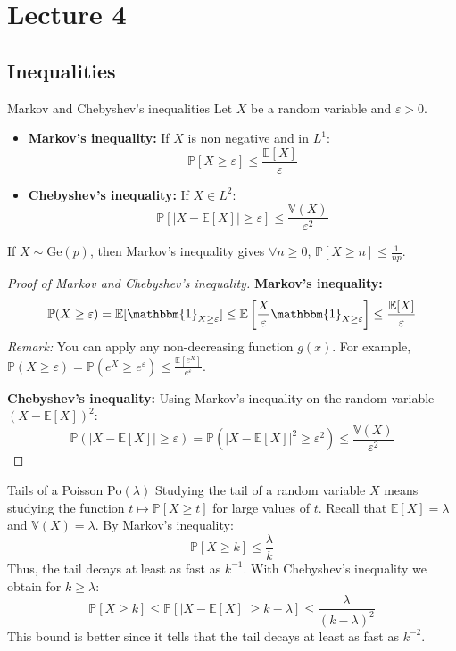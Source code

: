 \documentclass[11pt, a4paper]{article}
\newcommand{\eps}{\varepsilon}
\begin{document}

\section{Lecture 4}

\subsection{Inequalities}

\begin{proposition}{Markov and Chebyshev's inequalities}{}
Let $X$ be a random variable and $\eps > 0$.
\begin{itemize}
    \item \textbf{Markov's inequality:} If $X$ is non negative and in $L^1$:
    \[ \mathbb{P}[X \ge \eps] \le \frac{\mathbb{E}[X]}{\eps} \]
    \item \textbf{Chebyshev's inequality:} If $X \in L^2$:
    \[ \mathbb{P}[|X - \mathbb{E}[X]| \ge \eps] \le \frac{\mathbb{V}(X)}{\eps^2} \]
\end{itemize}
If $X \sim \text{Ge}(p)$, then Markov's inequality gives $\forall n \ge 0$, $\mathbb{P}[X \ge n] \le \frac{1}{np}$.
\end{proposition}

\begin{proof}[Proof of Markov and Chebyshev's inequality]
\textbf{Markov's inequality:}
\[ \mathbb{P}(X \ge \eps) = \mathbb{E}[\mathbbm{1}_{X \ge \eps}] \le \mathbb{E}\left[\frac{X}{\eps} \mathbbm{1}_{X \ge \eps}\right] \le \frac{\mathbb{E}[X]}{\eps} \]
\textit{Remark:} You can apply any non-decreasing function $g(x)$. For example, $\mathbb{P}(X \ge \eps) = \mathbb{P}(e^X \ge e^\eps) \le \frac{\mathbb{E}[e^X]}{e^\eps}$.

\textbf{Chebyshev's inequality:}
Using Markov's inequality on the random variable $(X - \mathbb{E}[X])^2$:
\[ \mathbb{P}(|X - \mathbb{E}[X]| \ge \eps) = \mathbb{P}(|X - \mathbb{E}[X]|^2 \ge \eps^2) \le \frac{\mathbb{V}(X)}{\eps^2} \]
\end{proof}

\begin{example}{Tails of a Poisson $\text{Po}(\lambda)$}{}
Studying the tail of a random variable $X$ means studying the function $t \mapsto \mathbb{P}[X \ge t]$ for large values of $t$.
Recall that $\mathbb{E}[X] = \lambda$ and $\mathbb{V}(X) = \lambda$. By Markov's inequality:
\[ \mathbb{P}[X \ge k] \le \frac{\lambda}{k} \]
Thus, the tail decays at least as fast as $k^{-1}$. With Chebyshev's inequality we obtain for $k \ge \lambda$:
\[ \mathbb{P}[X \ge k] \le \mathbb{P}[|X - \mathbb{E}[X]| \ge k - \lambda] \le \frac{\lambda}{(k - \lambda)^2} \]
This bound is better since it tells that the tail decays at least as fast as $k^{-2}$.
\end{example}
\end{document}
